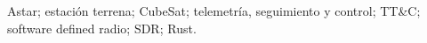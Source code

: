 Astar; estación terrena; CubeSat; telemetría, seguimiento y control; TT\&C; software defined radio; SDR; Rust.